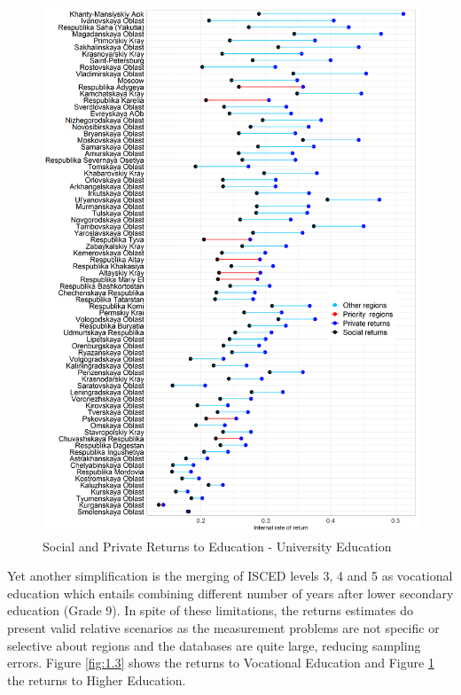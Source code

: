 \documentclass[alpha-refs]{wiley-article-05g}
\begin{document}
\begin{center}
	\begin{figure}[htbp!]
\begin{minipage}[b]{1\linewidth}
			\centering
			\includegraphics[scale=0.52]{returns_by_region_plot1.png}
		\end{minipage}
			\caption{Social and Private Returns to Education - University Education}\label{fig:1.4}
	\end{figure}
\end{center}

\vspace{-2em}

Yet another simplification is the merging of ISCED levels 3, 4 and 5 as vocational education which entails combining different number of years after lower secondary education (Grade 9). In spite of these limitations, the returns estimates do present valid relative scenarios as the measurement problems are not specific or selective about regions and the databases are quite large, reducing sampling errors. Figure \ref{fig:1.3}  shows the returns to Vocational Education and Figure \ref{fig:1.4} the returns to Higher Education. 
\end{document}
